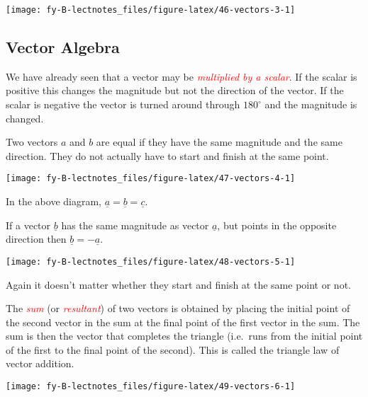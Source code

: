 \documentclass[
  11pt,
  oneside]{book}
\newcommand{\slide}{}
\theoremstyle{definition}
\theoremstyle{definition}
\theoremstyle{definition}
\theoremstyle{definition}
\theoremstyle{remark}
\begin{document}
\begin{center}\texttt{[image: fy-B-lectnotes\_files/figure-latex/46-vectors-3-1]} \end{center}

\slide

\subsection{Vector Algebra}\label{vector-algebra}

We have already seen that a vector may be \textcolor{red}{\em multiplied by a scalar}. If the scalar is positive this changes the magnitude but not the direction of the vector. If the scalar is negative the vector is turned around through \(180^\circ\) and the magnitude is changed.

Two vectors \(a\) and \(b\) are equal if they have the same magnitude and the same direction. They do not actually have to start and finish at the same point.

\begin{center}\texttt{[image: fy-B-lectnotes\_files/figure-latex/47-vectors-4-1]} \end{center}

In the above diagram, \(\underline a= \underline b = \underline c\).

If a vector \(\underline b\) has the same magnitude as vector \(\underline a\), but points in the opposite direction then \(\underline b = -\underline a\).

\begin{center}\texttt{[image: fy-B-lectnotes\_files/figure-latex/48-vectors-5-1]} \end{center}

Again it doesn't matter whether they start and finish at the same point or not.

The \textcolor{red}{\em sum} (or \textcolor{red}{\em resultant}) of two vectors is obtained by placing the initial point of the second vector in the sum at the final point of the first vector in the sum. The sum is then the vector that completes the triangle (i.e.~runs from the initial point of the first to the final point of the second). This is called the triangle law of vector addition.

\begin{center}\texttt{[image: fy-B-lectnotes\_files/figure-latex/49-vectors-6-1]} \end{center}
\end{document}
